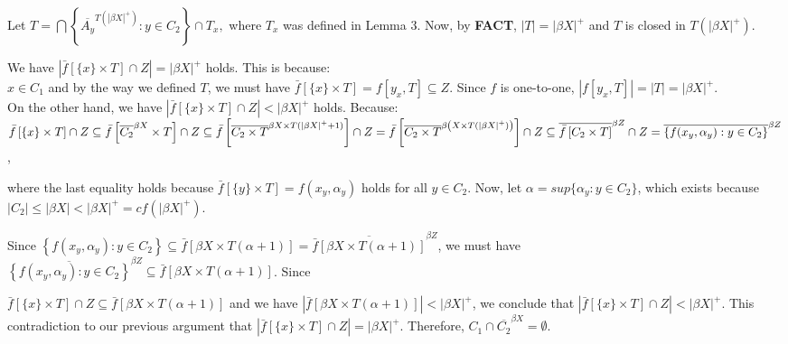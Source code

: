 \documentclass{article}
\begin{document}
Let $T=\bigcap \left\{ \overline{A_y}^{T(|\beta X|^+)} : y\in C_2 \right\}  \cap T_x,$ where $T_x$ was defined in Lemma 3. Now, by \textbf{FACT}, $|T|=\left|\beta X\right|^+ $ and $T$ is closed in $T(\left|\beta X \right| ^+)$. \\

\vskip 7pt

We have $\left|\bar{f}\left[\{x\} \times T \right] \cap Z \right| = \left|\beta X \right|^+$ holds. This is because:\\   $x\in C_1$ and by the way we defined $T$, we must have $\bar{f}\left[\{x\} \times T \right] = f\left[y_x, T\right]\subseteq Z.$ Since $f$ is one-to-one, $\left|f\left[y_x, T\right]\right|=|T|=\left|\beta X \right| ^+$. \\


\vskip 5pt
On the other hand, we have $\left|\bar{f}\left[\{x\} \times T \right] \cap Z \right| < \left|\beta X \right|^+$ holds. Because: \\
$\bar{f}\left[\{x\}\times T\right] \cap Z 
\subseteq \bar{f}\left[\overline{C_2}^{\beta X} \times T\right] \cap Z 
\subseteq \bar{f}\left[\overline{C_2\times T}^{\beta X \times T(|\beta X|^+ +1)}\right] \cap Z\\
=\bar{f}\left[\overline{C_2\times T}^{\beta \left(X \times T(|\beta X|^+ )\right)}\right] \cap Z
\subseteq \overline{\bar{f}\left[C_2\times T\right]}^{\beta Z} \cap Z
=\overline{    \left\{ f(x_y,\alpha_y): y\in C_2 \right\}        }^{\beta Z}$, 


where the last equality holds because  $\bar{f}\left[\{y\}\times T \right]=f(x_y,\alpha_y)$ holds for all $y \in C_2$. Now, let $\alpha=sup\{\alpha_y: y\in C_2\}$, which exists because $|C_2|\leq |\beta X| < |\beta X|^+= cf\left( \left|\beta X\right|^+ \right)$. 

Since $\left\{ f(x_y,\alpha_y): y\in C_2 \right\} 
\subseteq \bar{f}\left[\beta X \times T(\alpha +1) \right] = \overline{ \bar{f}\left[\beta X \times T(\alpha +1) \right]}^{\beta Z}$, we must have $\overline{    \left\{ f(x_y,\alpha_y): y\in C_2 \right\}        }^{\beta Z} \subseteq \bar{f}\left[\beta X \times T(\alpha +1) \right] $. Since 

$\bar{f}\left[\{x\}\times T\right] \cap Z 
\subseteq \bar{f}\left[\beta X \times T(\alpha +1) \right]$ 
and we have $\left| \bar{f}\left[\beta X \times T(\alpha +1) \right] \right| < |\beta X |^+$, we conclude that 
$\left|\bar{f}\left[\{x\} \times T \right] \cap Z \right| < \left|\beta X \right|^+$. This contradiction to our 
previous argument that $ \left|\bar{f}\left[\{x\} \times T \right] \cap Z \right| = \left|\beta X \right|^+$. Therefore, 
$C_1\cap \overline{C_2}^{\beta X}=\emptyset$. 
\end{document}
